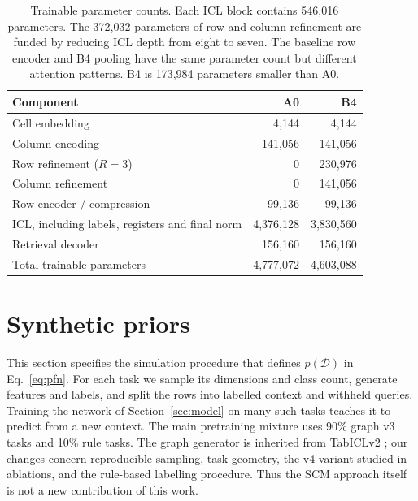 \documentclass[11pt]{article}
\begin{document}
\begin{table}[t]
\centering
\small
\begin{tabular}{lrr}
\toprule
Component & A0 & B4 \\
\midrule
Cell embedding & 4,144 & 4,144 \\
Column encoding & 141,056 & 141,056 \\
Row refinement ($R=3$) & 0 & 230,976 \\
Column refinement & 0 & 141,056 \\
Row encoder / compression & 99,136 & 99,136 \\
ICL, including labels, registers and final norm & 4,376,128 & 3,830,560 \\
Retrieval decoder & 156,160 & 156,160 \\
\midrule
Total trainable parameters & 4,777,072 & 4,603,088 \\
\bottomrule
\end{tabular}
\caption{Trainable parameter counts. Each ICL block contains 546,016 parameters. The 372,032
parameters of row and column refinement are funded by reducing ICL depth from eight to seven.
The baseline row encoder and B4 pooling have the same parameter count but different attention
patterns. B4 is 173,984 parameters smaller than A0.}
\label{tab:params}
\end{table}

\section{Synthetic priors}
\label{sec:prior}

This section specifies the simulation procedure that defines $p(\mathcal{D})$ in
Eq.~\eqref{eq:pfn}. For each task we sample its dimensions and class count, generate features and
labels, and split the rows into labelled context and withheld queries. Training the network of
Section~\ref{sec:model} on many such tasks teaches it to predict from a new context.
The main pretraining mixture uses 90\% graph v3 tasks and 10\% rule tasks.
The graph generator is inherited from TabICLv2 \cite{tabiclv2}; our changes concern reproducible
sampling, task geometry, the v4 variant studied in ablations, and the rule-based labelling procedure.
Thus the SCM approach itself is not a new contribution of this work.
\end{document}
